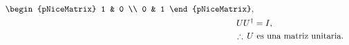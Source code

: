 \documentclass[./../main.tex]{subfiles}
\begin{document}
\begin{problema}
\begin{align*}
\begin{pNiceMatrix}
			                   1 & 0 \\
			                   0 & 1
		                   \end{pNiceMatrix},                                                                                                                                                                                                                                           \\
		UU^{\dagger}   & = I,                                                                                                                                                                                                                                                           \\
		\therefore\, U & \text{ es una matriz unitaria}.
	\end{align*}
\end{problema}
\end{document}
